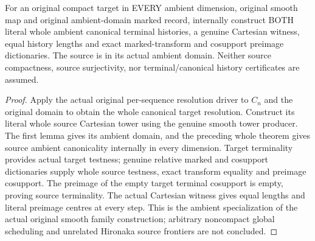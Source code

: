 \begin{theorem}
\label{hir:smooth-original-ambient-canonical-terminal-constructor}
\leanok
{}
For an original compact target in EVERY ambient dimension, original smooth
map and original ambient-domain marked record, internally construct BOTH
literal whole ambient canonical terminal histories, a genuine Cartesian
witness, equal history lengths and exact marked-transform and cosupport
preimage dictionaries. The source is in its actual ambient domain.
Neither source compactness, source surjectivity, nor terminal/canonical
history certificates are assumed.
\end{theorem}
\begin{proof}
Apply the actual original per-sequence resolution driver to $C_n$ and the
original domain to obtain the whole canonical target resolution. Construct
its literal whole source Cartesian tower using the genuine smooth tower
producer. The first lemma gives its ambient domain, and the preceding
whole theorem gives source ambient canonicality internally in every
dimension. Target terminality provides actual target testness; genuine
relative marked and cosupport dictionaries supply whole source testness,
exact transform equality and preimage cosupport. The preimage of the empty
target terminal cosupport is empty, proving source terminality. The actual
Cartesian witness gives equal lengths and literal preimage centres at every
step. This is the ambient specialization of the actual original smooth
family construction; arbitrary noncompact global scheduling and unrelated
Hironaka source frontiers are not concluded.
\end{proof}
